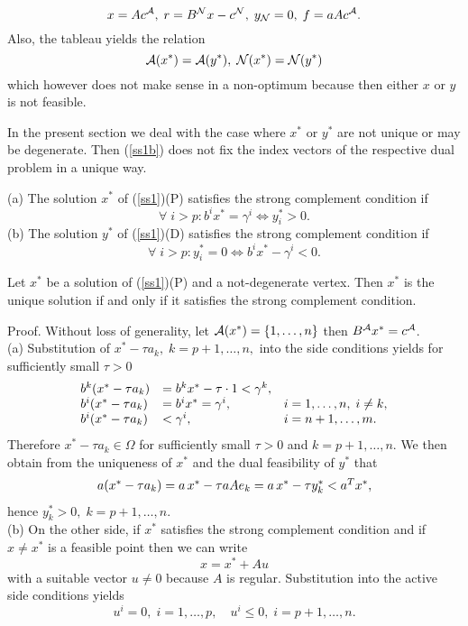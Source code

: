 \[
x = Ac^{\A}, \; r = B^{\N}x - c^{\N}, \;
y_{\N} = 0, \; f = aAc^{\A}.
\]
Also, the tableau yields the relation
\begin{equation} \label{ss1b}
\A(x^*) = \A(y^*), \; \N(x^*) = \N(y^*)
\end{equation}
which however does not make sense in a non-optimum because then either $x$ or
$y$ is not feasible.
\par
In the present section we deal with the case where $x^*$ or $y^*$ are not
unique or may be degenerate. Then (\ref{ss1b}) does not fix the index
vectors of the respective dual problem in a unique way.
%
 \begin{definition}
\label{ss3} (a) The solution $x^*$ of (\ref{ss1})(P) satisfies the strong
complement condition if
\[
\forall \; i > p:  b^ix^* =  \gamma ^i \Longleftrightarrow y^*_i > 0.
\]
(b) The solution $y^*$ of (\ref{ss1})(D) satisfies the strong complement
condition if
\[
\forall \; i > p: y^*_i = 0 \Longleftrightarrow b^ix^* - \gamma ^i < 0.
\]
\end{definition}
%
\begin{theorem} \label{ss4}
Let $x^*$ be a solution of (\ref{ss1})(P) and a not-degenerate vertex. Then
$x^*$ is the unique solution if and only if it satisfies  the strong
complement condition.
\end{theorem}
%
Proof.
Without loss of generality, let $\A(x^*) = \{1, \ldots, n\}$ then $B^{\A}x^* =
c^{\A}$.\\
(a) Substitution of $x^* - \tau a_k, \; k = p+1, \ldots ,n,$ into the
side conditions yields for sufficiently small $\tau > 0$
%
\[ \ba{.}{lll}
b^k(x^* - \tau a_k) &=  b^kx^* - \tau \cdot 1  < \gamma ^k,\\
b^i(x^* - \tau a_k) &=  b^ix^*  = \gamma ^i, & i = 1, \ldots , n , \; i
\neq k,\\
b^i(x^* - \tau a_k) &< \gamma ^i, & i = n+1, \ldots ,m.
\ea{.}
\]
Therefore $x^* - \tau a_k \in \Omega$ for sufficiently small
$\tau > 0$ and $k = p + 1, \ldots, n$.  We then obtain from the uniqueness of
$x^*$ and the dual feasibility of $y^*$ that
%
\[ \ba{.}{l}
a(x^* - \tau a_k) = a \, x^* - \tau aAe_k
= a \, x^* - \tau y^*_k < a^Tx^*,
\ea{.}
\]
hence $y^*_k > 0, \; k = p + 1, \ldots , n$.\\
(b) On the other side, if $x^*$ satisfies the strong complement condition
and if $x \neq x^*$ is a feasible point then we can write
\[
x = x^* +  Au
\]
with a suitable vector $u \neq 0$ because $A$ is regular. Substitution
into the active side conditions yields
\[
u^i = 0, \; i = 1, \ldots, p, \quad u^i \leq 0, \; i = p + 1, \ldots, n.
\]
